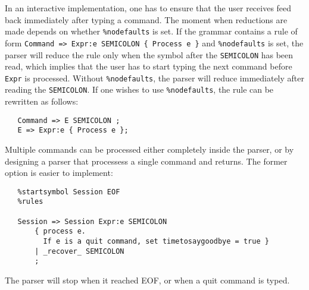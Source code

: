 \documentclass{article}
\begin{document}
In an interactive implementation, one has to ensure that the 
user receives feed back immediately after typing a command. 
The moment when reductions are made depends on whether 
\verb+%nodefaults+ is set. 
If the grammar contains a rule of form 
\verb+Command => Expr:e SEMICOLON { Process e }+ 
and \verb+%nodefaults+ is set, the parser will reduce the rule
only when the symbol after the \verb+SEMICOLON+ has been read, which 
implies  that the user has to start typing the next command before 
\verb+Expr+ is processed. 
Without \verb+%nodefaults+, the parser will reduce immediately after
reading the \verb+SEMICOLON+. 
If one wishes to use \verb+%nodefaults+, the rule can be rewritten as
follows: 
\begin{verbatim}
   Command => E SEMICOLON ;
   E => Expr:e { Process e }; \end{verbatim}

\noindent
Multiple commands can be processed either completely inside the parser,
or by designing a parser that processess a single command and returns. 
The former option is easier to implement: 
\begin{verbatim}
   %startsymbol Session EOF
   %rules 

   Session => Session Expr:e SEMICOLON 
       { process e. 
         If e is a quit command, set timetosaygoodbye = true } 
       | _recover_ SEMICOLON
       ; \end{verbatim} 
The parser will stop when it reached EOF, or when a quit command is typed. 
\end{document}
